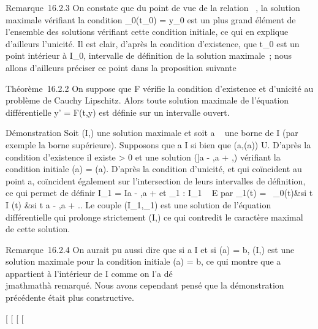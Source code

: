 \documentclass[]{article}
\begin{document}
Remarque~16.2.3 On constate que du point de vue de la relation \prec~, la
solution maximale vérifiant la condition \phi_0(t_0) =
y_0 est un plus grand élément de l'ensemble des solutions
vérifiant cette condition initiale, ce qui en explique d'ailleurs
l'unicité. Il est clair, d'après la condition d'existence, que
t_0 est un point intérieur à I_0, intervalle de
définition de la solution maximale~; nous allons d'ailleurs préciser ce
point dans la proposition suivante

Théorème~16.2.2 On suppose que F vérifie la condition d'existence et
d'unicité au problème de Cauchy Lipschitz. Alors toute solution maximale
de l'équation différentielle y' = F(t,y) est définie sur un intervalle
ouvert.

Démonstration Soit (I,\phi) une solution maximale et soit a
\in\overline{}~ une borne de I (par exemple la borne
supérieure). Supposons que a \in I si bien que (a,\phi(a)) \in U. D'après la
condition d'existence il existe \eta \textgreater{} 0 et une solution ({]}a
- \eta,a + \eta{[},\psi) vérifiant la condition initiale \psi(a) = \phi(a). D'après la
condition d'unicité, \phi et \psi qui coïncident au point a, coïncident
également sur l'intersection de leurs intervalles de définition, ce qui
permet de définir I_1 = I\cup{]}a - \eta,a + \eta{[} et \phi_1 :
I_1 \rightarrow~ E par \phi_1(t) = \left
\ \cases \phi_0(t)&si t \in I
\cr \psi(t) &si t \in{]}a - \eta,a + \eta{[} 
\right .. Le couple (I_1,\phi_1) est une
solution de l'équation différentielle qui prolonge strictement (I,\phi) ce
qui contredit le caractère maximal de cette solution.

Remarque~16.2.4 On aurait pu aussi dire que si a \in I et si \phi(a) = b,
(I,\phi) est une solution maximale pour la condition initiale \phi(a) = b, ce
qui montre que a appartient à l'intérieur de I comme on l'a dé\\jmathmathà
remarqué. Nous avons cependant pensé que la démonstration précédente
était plus constructive.

{[}
{[}
{[}
{[}
\end{document}
